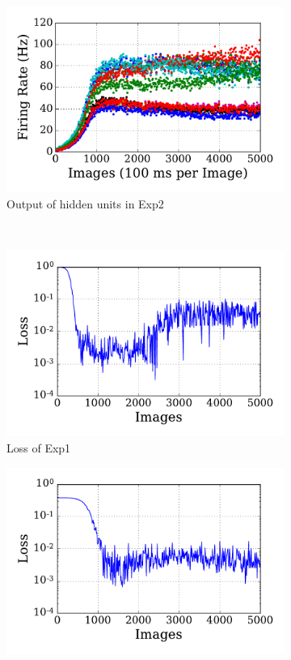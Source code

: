 \begin{figure}
\begin{subfigure}[t]{0.45\textwidth}
		\includegraphics[width=\textwidth]{pics_sdlm/10_exp_SRBM_Orig/exp2_hid_s.pdf}
		\caption{Output of hidden units in Exp2}
	\end{subfigure}\\
	\begin{subfigure}[t]{0.45\textwidth}
		\includegraphics[width=\textwidth]{pics_sdlm/10_exp_SRBM_Orig/exp1_mse_nons.pdf}
		\caption{Loss of Exp1}
	\end{subfigure}
	\begin{subfigure}[t]{0.45\textwidth}
		\includegraphics[width=\textwidth]{pics_sdlm/10_exp_SRBM_Orig/exp2_mse_nons.pdf}

\end{subfigure}
\end{figure}
